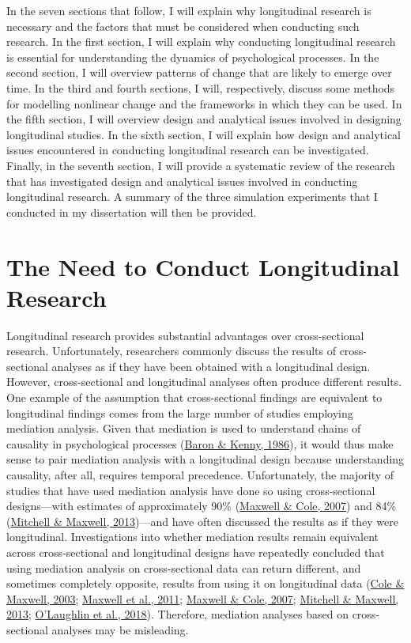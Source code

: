 \documentclass[
12pt, %
twoside,
english]{guelphthesis}
\begin{document}
In the seven sections that follow, I will explain why longitudinal research is necessary and the factors that must be considered when conducting such research. In the first section, I will explain why conducting longitudinal research is essential for understanding the dynamics of psychological processes. In the second section, I will overview patterns of change that are likely to emerge over time. In the third and fourth sections, I will, respectively, discuss some methods for modelling nonlinear change and the frameworks in which they can be used. In the fifth section, I will overview design and analytical issues involved in designing longitudinal studies. In the sixth section, I will explain how design and analytical issues encountered in conducting longitudinal research can be investigated. Finally, in the seventh section, I will provide a systematic review of the research that has investigated design and analytical issues involved in conducting longitudinal research. A summary of the three simulation experiments that I conducted in my dissertation will then be provided.

\hypertarget{the-need-to-conduct-longitudinal-research}{%
\section{The Need to Conduct Longitudinal Research}\label{the-need-to-conduct-longitudinal-research}}

Longitudinal research provides substantial advantages over cross-sectional research. Unfortunately, researchers commonly discuss the results of cross-sectional analyses as if they have been obtained with a longitudinal design. However, cross-sectional and longitudinal analyses often produce different results. One example of the assumption that cross-sectional findings are equivalent to longitudinal findings comes from the large number of studies employing mediation analysis. Given that mediation is used to understand chains of causality in psychological processes (\protect\hyperlink{ref-baron1986}{Baron \& Kenny, 1986}), it would thus make sense to pair mediation analysis with a longitudinal design because understanding causality, after all, requires temporal precedence. Unfortunately, the majority of studies that have used mediation analysis have done so using cross-sectional designs---with estimates of approximately 90\% (\protect\hyperlink{ref-maxwell2007}{Maxwell \& Cole, 2007}) and 84\% (\protect\hyperlink{ref-mitchell2013}{Mitchell \& Maxwell, 2013})---and have often discussed the results as if they were longitudinal. Investigations into whether mediation results remain equivalent across cross-sectional and longitudinal designs have repeatedly concluded that using mediation analysis on cross-sectional data can return different, and sometimes completely opposite, results from using it on longitudinal data (\protect\hyperlink{ref-cole2003}{Cole \& Maxwell, 2003}; \protect\hyperlink{ref-maxwell2011}{Maxwell et al., 2011}; \protect\hyperlink{ref-maxwell2007}{Maxwell \& Cole, 2007}; \protect\hyperlink{ref-mitchell2013}{Mitchell \& Maxwell, 2013}; \protect\hyperlink{ref-olaughlin2018}{O'Laughlin et al., 2018}). Therefore, mediation analyses based on cross-sectional analyses may be misleading.
\end{document}
